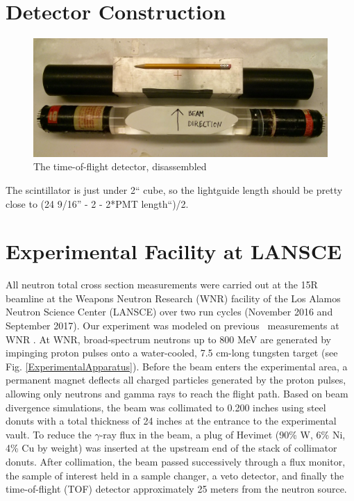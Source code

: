 \section{Detector Construction}
\begin{figure}
    \includegraphics[scale=0.2]{figures/Scintillator_disassembled.jpg}
    \caption{The time-of-flight detector, disassembled}
    \label{TOFDetectorDisassembled}
\end{figure}


The scintillator is just under 2`` cube, so the lightguide length should be pretty close to (24
9/16'' - 2 - 2*PMT length``)/2. 

\section{Experimental Facility at LANSCE}
All neutron total cross section measurements were carried out at the 15R
beamline at the Weapons Neutron Research (WNR) facility of the Los Alamos
Neutron Science Center (LANSCE) over two run cycles (November 2016 and
September 2017). Our experiment was modeled on previous
\tot\ measurements at WNR \cite{Finlay1993,Abfalterer2001,Shane2010}. At WNR,
broad-spectrum neutrons up
to 800 MeV are generated by impinging proton pulses onto a water-cooled, 7.5
cm-long tungsten target (see Fig. \ref{ExperimentalApparatus}). Before the beam
enters the experimental area, a
permanent magnet deflects all charged particles generated by the proton pulses, 
allowing only neutrons and gamma rays to reach the flight path. Based on beam divergence
simulations, the beam was collimated to 0.200 inches using steel
donuts with a total thickness of 24 inches at the entrance to the experimental vault. To
reduce the $\gamma$-ray flux in the beam, a plug of Hevimet (90\% W, 6\% 
Ni, 4\% Cu by weight) was inserted at the upstream end of the
stack of collimator donuts. After collimation, the beam passed successively through a flux 
monitor, the sample of interest held in a sample changer, a veto detector, and finally the 
time-of-flight (TOF) detector approximately 25 meters from the neutron source.

